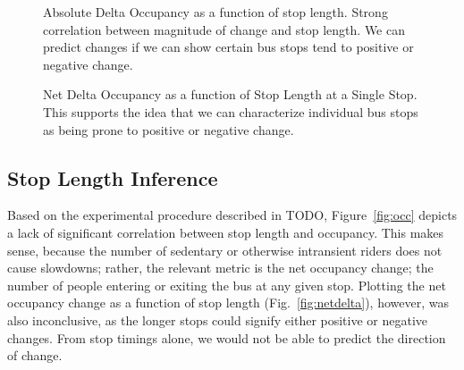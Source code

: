 \begin{figure}
  \centering
  \caption{
    Absolute Delta Occupancy as a function of stop length.
    Strong correlation between magnitude of change and stop length.
    We can predict changes if we can show certain bus stops tend to positive or negative change.
  }
  \label{fig:absdelta}
\end{figure}

\begin{figure}
  \centering
  \caption{
    Net Delta Occupancy as a function of Stop Length at a Single Stop.
    This supports the idea that we can characterize individual bus stops as being prone to positive or negative change.
  }
  \label{fig:onestop}
\end{figure}


\subsection{Stop Length Inference}

Based on the experimental procedure described in TODO, Figure~\ref{fig:occ} depicts a lack of significant correlation between stop length and occupancy.
This makes sense, because the number of sedentary or otherwise intransient riders does not cause slowdowns; rather, the relevant metric is the net occupancy change; the number of people entering or exiting the bus at any given stop.
Plotting the net occupancy change as a function of stop length (Fig.~\ref{fig:netdelta}), however, was also inconclusive, as the longer stops could signify either positive or negative changes.
From stop timings alone, we would not be able to predict the direction of change.


